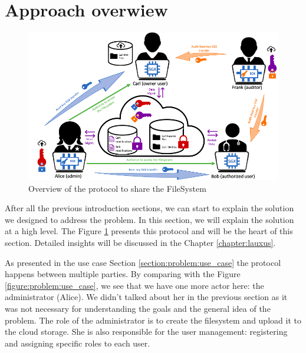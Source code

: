 \documentclass[../main.tex]{subfiles}
\begin{document}
\section{Approach overwiew}
\label{section:lauxus:approach}

\begin{figure}[h]
    \centering
    \includegraphics[width=\textwidth]{../../images/lauxus/approach}
    
    \caption{Overview of the protocol to share the FileSystem}
    \label{figure:lauxus:approach}
\end{figure}

\par After all the previous introduction sections, we can start to explain the solution we designed to address the problem. In this section, we will explain the solution at a high level. The Figure \ref{figure:lauxus:approach} presents this protocol and will be the heart of this section. Detailed insights will be discussed in the Chapter \ref{chapter:lauxus}.
\par As presented in the use case Section \ref{section:problem:use_case} the protocol happens between multiple parties. By comparing with the Figure \ref{figure:problem:use_case}, we see that we have one more actor here: the administrator (Alice). We didn't talked about her in the previous section as it was not necessary for understanding the goals and the general idea of the problem. The role of the administrator is to create the filesystem and upload it to the cloud storage. She is also responsible for the user management: registering and assigning specific roles to each user.
\end{document}
